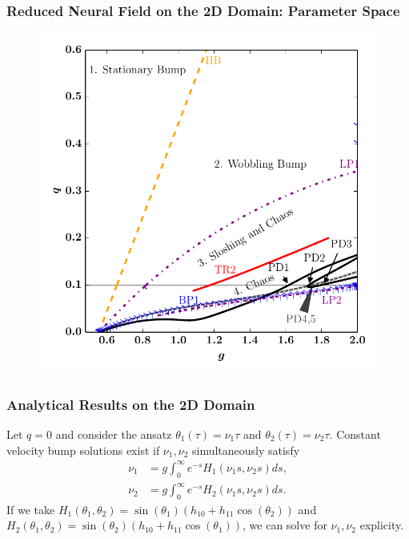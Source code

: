 \documentclass{beamer}
\begin{document}
\begin{frame}
\frametitle{Reduced Neural Field on the 2D Domain: Parameter Space}
\begin{figure}
 \includegraphics[width=.6\textwidth]{twod_phase_auto_3terms_2par.pdf}
\end{figure}
\end{frame}



\begin{frame}
\frametitle{Analytical Results on the 2D Domain}
Let $q=0$ and consider the ansatz $\theta_1(\tau) = \nu_1\tau$ and $\theta_2(\tau) = \nu_2\tau$. Constant velocity bump solutions exist if $\nu_1,\nu_2$ simultaneously satisfy
\begin{equation*}
\begin{split}
 \nu_1 &=  g \int_0^\infty e^{-s} H_1(\nu_1 s,\nu_2 s) ds,\\
 \nu_2 &=  g \int_0^\infty e^{-s} H_2(\nu_1 s,\nu_2 s) ds.
\end{split}
\end{equation*}
If we take $H_1(\theta_1,\theta_2) = \sin(\theta_1)(h_{10} + h_{11}\cos(\theta_2))$ and $H_2(\theta_1,\theta_2) = \sin(\theta_2)(h_{10} + h_{11}\cos(\theta_1))$, we can solve for $\nu_1,\nu_2$ explicity.
\end{frame}
\end{document}
